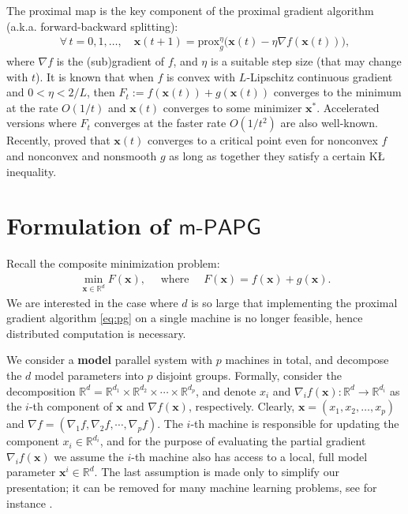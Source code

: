 \documentclass[leqno,onefignum,onetabnum]{siamart0516}
\newcommand{\aka}{{a.k.a.}\xspace}
\newcommand{\xb}{\mathbf{x}}
\newcommand{\RR}{\mathds{R}}
\newcommand{\prox}[2][\eta]{\mathrm{prox}_{#2}^{#1}}
\newcommand{\KL}{K\L\xspace}
\newcommand{\mspg}{\textsf{m-PAPG}\xspace}
\begin{document}
The proximal map is the key component of the proximal gradient algorithm \cite{FukushimaMine81} (\aka forward-backward splitting):
\begin{align}
\label{eq:pg}
\forall\,t = 0, 1, \ldots, \quad \xb(t+1) = \prox[\eta]{g}\big(\xb(t) - \eta \nabla f(\xb(t))\big),
\end{align}
where $\nabla f$ is the (sub)gradient of $f$, and $\eta$ is a suitable step size (that may  change with $t$). It is known that when $f$ is convex with $L$-Lipschitz continuous gradient  and $0 < \eta < 2/L$, then $F_t := f(\xb(t))+g(\xb(t))$ converges to the minimum at the rate $O(1/t)$ and $\xb(t)$ converges to some minimizer $\xb^*$. Accelerated versions \cite{FISTA,Nesterov13} where $F_t$ converges at the faster rate $O(1/t^2)$ are also well-known. Recently, \cite{prox_alter_linear} proved that $\xb(t)$ converges to a critical point even for nonconvex $f$ and nonconvex and nonsmooth $g$ as long as together they satisfy a certain \KL inequality.




\section{Formulation of $\mspg$}\label{sec: models}
Recall the composite minimization problem:
\begin{align}
\label{compmin}
\min_{\xb\in\RR^d} F(\xb), \quad \mbox{ where } \quad F(\xb) = f(\xb) + g(\xb). \tag{P}
\end{align}
We are interested in the case where $d$ is so large that implementing the proximal gradient algorithm \eqref{eq:pg} on a single machine is no longer feasible, hence distributed computation is necessary.

We consider a \textbf{model} parallel system with $p$ machines in total, and decompose the $d$ model parameters into $p$ disjoint groups.
Formally, consider the decomposition $ \RR^d = \RR^{d_1} \times \RR^{d_2} \times\cdots\times\RR^{d_p}$, and denote $x_i$ and $\nabla_i f(\xb): \RR^d \to \RR^{d_i}$ as the $i$-th component of $\xb$ and $\nabla f(\xb)$, respectively. Clearly, $\xb = (x_1, x_2, \ldots, x_p)$ and $\nabla f = (\nabla_1 f, \nabla_2 f, \cdots, \nabla_p f)$. The $i$-th machine is responsible for updating the component $x_i\in\RR^{d_i}$, and for the purpose of evaluating the partial gradient $\nabla_i f(\xb)$ we assume the $i$-th machine also has access to a local, full model parameter $\xb^i\in\RR^d$. The last assumption is made only to simplify our presentation; it can be removed for many machine learning problems, see for instance \cite{random_block_coord,mspg}. 
\end{document}
